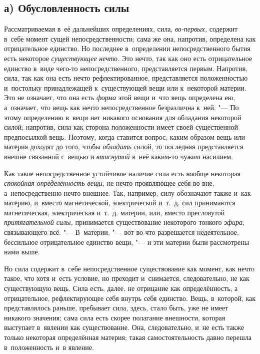 \subsection[а) Обусловленность силы]{а) Обусловленность силы}

Рассматриваемая в~её дальнейших определениях,
сила, {\em во-первых,} содержит в~себе момент сущей
непосредственности; сама же она, напротив, определена как отрицательное
единство. Но последнее в~определении непосредственного бытия есть некоторое
{\em существующее} {\em нечто}. Это
нечто, так как оно есть отрицательное единство в~виде чего-то
непосредственного, представляется первым. Напротив, сила, так как она есть
нечто рефлектированное, представляется положенностью и~постольку
принадлежащей к~существующей вещи или к~некоторой материи. Это не означает,
что она есть {\em форма} этой вещи и~что вещь
определена ею, а~означает, что вещь как нечто непосредственное безразлична
к~ней. "--- По этому определению в~вещи нет никакого основания для обладания
некоторой силой; напротив, сила как сторона положенности имеет своей
существенной предпосылкой вещь. Поэтому, когда ставится вопрос, каким
образом вещь или материя доходят до того, чтобы
{\em обладать} силой, то последняя представляется
внешне связанной с~вещью и {\em втиснутой} в~неё
каким-то чужим насилием.

Как такое непосредственное устойчивое наличие сила есть вообще некоторая
{\em спокойная определённость вещи,} не нечто
проявляющее себя во вне, а~непосредственно нечто внешнее. Так, например,
силу обозначают также и~как материю, и~вместо магнетической, электрической
и~т.~д. сил принимаются магнетическая, электрическая и~т.~д. материи, или,
вместо пресловутой {\em притягательной силы,}
принимается существование некоторого тонкого
{\em эфира,} связывающего всё. "--- В~материи, "--- вот во
что разрешается недеятельное, бессильное отрицательное единство вещи, "--- и
эти материи были рассмотрены нами выше.

Но сила содержит в~себе непосредственное существование как момент, как нечто
такое, что хотя и~есть условие, но преходит и~снимается, следовательно, не
как существующую вещь. Сила есть, далее, не отрицание как определённость, а
отрицательное, рефлектирующее себя внутрь себя единство. Вещь, в~которой,
как представлялось раньше, пребывает сила, здесь, стало быть, уже не имеет
никакого значения; сама сила есть скорее полагание внешности, которая
выступает в~явлении как существование. Она, следовательно, и~не есть также
только некоторая определённая материя; такая самостоятельность давно
перешла в~положенность и~в явление.

